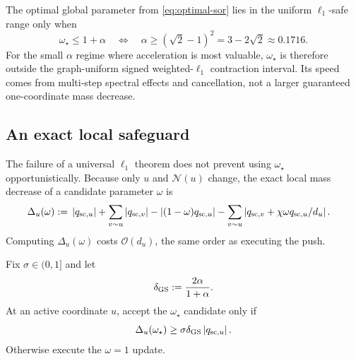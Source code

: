 The optimal global parameter from \cref{eq:optimal-sor} lies in the uniform
\(\ell_1\)-safe range only when
\begin{equation}
    \omega_\star\leq1+\alpha
    \quad\Longleftrightarrow\quad
    \alpha\geq(\sqrt2-1)^2=3-2\sqrt2\approx0.1716.
    \label{eq:omega-star-safe-condition}
\end{equation}
For the small \(\alpha\) regime where acceleration is most valuable,
\(\omega_\star\) is therefore outside the graph-uniform signed
weighted-\(\ell_1\) contraction interval.  Its speed comes from multi-step
spectral effects and cancellation, not a larger guaranteed one-coordinate
mass decrease.

\subsection{An exact local safeguard}

The failure of a universal \(\ell_1\) theorem does not prevent using
\(\omega_\star\) opportunistically.  Because only \(u\) and
\(\mathcal N(u)\) change,
the exact local mass decrease of a candidate parameter \(\omega\) is
\begin{align}
    \Delta_u(\omega)
    &:={}
    \left\lvert q_{\mathrm{sc},u}\right\rvert+\sum_{v\sim u}\left\lvert q_{\mathrm{sc},v}\right\rvert
    -\left\lvert (1-\omega)q_{\mathrm{sc},u}\right\rvert
    -\sum_{v\sim u}
       \left\lvert q_{\mathrm{sc},v}+\chi\omega q_{\mathrm{sc},u}/d_u\right\rvert.
    \label{eq:exact-local-mass-decrease}
\end{align}
Computing \(\Delta_u(\omega)\) costs \(\mathcal O(d_u)\), the same order as
executing the push.

\begin{definition}
\label{def:safeguarded-sor}
Fix \(\sigma\in(0,1]\) and let
\begin{equation}
    \delta_{\rm GS}:=\frac{2\alpha}{1+\alpha}.
    \label{eq:gs-delta}
\end{equation}
At an active coordinate \(u\), accept the \(\omega_\star\) candidate only if
\begin{equation}
    \Delta_u(\omega_\star)
    \geq\sigma\delta_{\rm GS}\left\lvert q_{\mathrm{sc},u}\right\rvert.
    \label{eq:safeguard-test}
\end{equation}
Otherwise execute the \(\omega=1\) update.
\end{definition}


